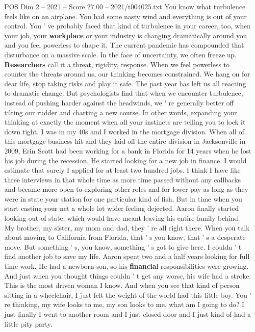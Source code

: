 \begin{textsample}{POS Dim 2 – 2021 – Score 27.00 – 2021/t004025.txt}
You know what turbulence feels like on an airplane.
You had some nasty wind and everything is out of your control.
You ' ve probably faced that kind of turbulence in your career, too, when your job, your \textbf{workplace} or your industry is changing dramatically around you and you feel powerless to shape it.
The current pandemic has compounded that disturbance on a massive scale.
In the face of uncertainty, we often freeze up. \textbf{Researchers} call it a threat, rigidity, response.
When we feel powerless to counter the threats around us, our thinking becomes constrained.
We hang on for dear life, stop taking risks and play it safe.
The past year has left us all reacting to dramatic change.
But psychologists find that when we encounter turbulence, instead of pushing harder against the headwinds, we ' re generally better off tilting our rudder and charting a new course.
In other words, expanding your thinking at exactly the moment when all your instincts are telling you to lock it down tight.
I was in my 40s and I worked in the mortgage division.
When all of this mortgage business hit and they laid off the entire division in Jacksonville in 2009, Erin Scott had been working for a bank in Florida for 14 years when he lost his job during the recession.
He started looking for a new job in finance.
I would estimate that surely I applied for at least two hundred jobs.
I think I have like three interviews in that whole time as more time passed without any callbacks and became more open to exploring other roles and for lower pay as long as they were in state your station for one particular kind of fish.
But in time when you start casting your net a whole lot wider feeling dejected.
Aaron finally started looking out of state, which would have meant leaving his entire family behind.
My brother, my sister, my mom and dad, they ' re all right there.
When you talk about moving to California from Florida, that ' s you know, that ' s a desperate move.
But something ' s, you know, something ' s got to give here.
I couldn ' t find another job to save my life.
Aaron spent two and a half years looking for full time work.
He had a newborn son, so his \textbf{financial} responsibilities were growing.
And just when you thought things couldn ' t get any worse, his wife had a stroke.
This is the most driven woman I know.
And when you see that kind of person sitting in a wheelchair, I just felt the weight of the world had this little boy.
You ' re thinking, my wife looks to me, my son looks to me, what am I going to do?
I just finally I went to another room and I just closed door and I just kind of had a little pity party.

\end{textsample}
